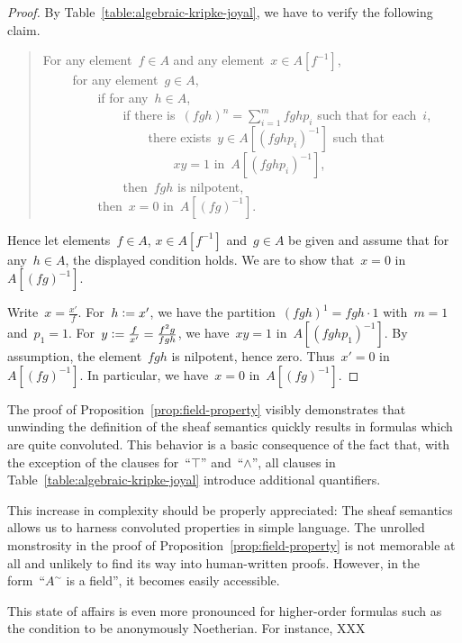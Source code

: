 \documentclass{ws-rv9x6}
\newcommand{\defeq}{\vcentcolon=}
\renewcommand{\_}{\mathpunct{.}}
\newcommand{\?}{\,{:}\,}
\begin{document}
\begin{proof}By Table~\ref{table:algebraic-kripke-joyal}, we have to verify the
following claim.
\begin{quote}
For any element~$f \in A$ and any element~$x \in A[f^{-1}]$, \\
${\qquad}$ for any element~$g \in A$, \\
${\qquad\qquad}$ if for any~$h \in A$, \\
${\qquad\qquad\qquad}$ if there is~$(fgh)^n = \sum_{i=1}^m fghp_i$
such that for each~$i$, \\
${\qquad\qquad\qquad\qquad}$ there exists~$y \in
A[(fghp_i)^{-1}]$ such that \\
${\qquad\qquad\qquad\qquad\qquad}$ $xy = 1$ in~$A[(fghp_i)^{-1}]$, \\
${\qquad\qquad\qquad}$ then~$fgh$ is nilpotent, \\
${\qquad\qquad}$ then~$x = 0$ in~$A[(fg)^{-1}]$.
\end{quote}
Hence let elements~$f \in A$, $x \in A[f^{-1}]$ and~$g \in A$ be given and
assume that for any~$h \in A$, the displayed condition holds. We are to show
that~$x = 0$ in~$A[(fg)^{-1}]$.

Write~$x = \frac{x'}{f}$. For~$h \defeq x'$, we have the
partition~$(fgh)^1 = fgh \cdot 1$ with~$m = 1$ and~$p_1 = 1$. For~$y \defeq
\frac{f}{x'} = \frac{f^2g}{fgh}$, we have~$xy = 1$ in~$A[(fghp_1)^{-1}]$.
By assumption, the element~$fgh$ is nilpotent, hence zero. Thus~$x' = 0$
in~$A[(fg)^{-1}]$. In particular, we have~$x = 0$ in~$A[(fg)^{-1}]$.
\end{proof}

The proof of Proposition~\ref{prop:field-property} visibly demonstrates that
unwinding the definition of the sheaf semantics quickly results in formulas
which are quite convoluted. This behavior is a basic consequence of the fact
that, with the exception of the clauses for~``$\top$'' and~``$\wedge$'', all
clauses in Table~\ref{table:algebraic-kripke-joyal} introduce additional
quantifiers.

This increase in complexity should be properly appreciated: The sheaf semantics
allows us to harness convoluted properties in simple language. The unrolled
monstrosity in the proof of Proposition~\ref{prop:field-property} is not
memorable at all and unlikely to find its way into human-written proofs.
However, in the form~``$A^\sim$ is a field'', it becomes easily accessible.

This state of affairs is even more pronounced for higher-order formulas such as
the condition to be anonymously Noetherian. For instance, XXX
\end{document}

